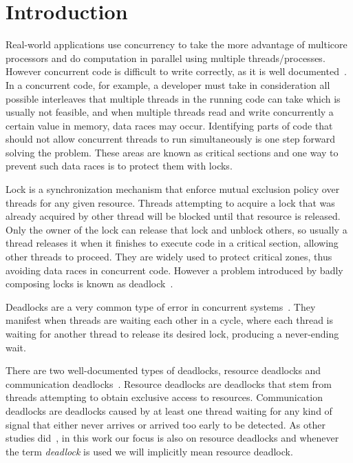 \chapter{Introduction}
\label{chp:introduction}


Real-world applications use concurrency to take the more advantage of multicore processors and do computation in parallel using multiple threads/processes.
However concurrent code is difficult to write correctly, as it is well documented~\citep{lu}.
In a concurrent code, for example, a developer must take in consideration all possible interleaves that multiple threads in the running code can take which is usually not feasible, and when multiple threads read and write concurrently a certain value in memory, data races may occur.
Identifying parts of code that should not allow concurrent threads to run simultaneously is one step forward solving the problem.
These areas are known as critical sections and one way to prevent such data races is to protect them with locks.

Lock is a synchronization mechanism that enforce mutual exclusion policy over threads for any given resource.
Threads attempting to acquire a lock that was already acquired by other thread will be blocked until that resource is released. 
Only the owner of the lock can release that lock and unblock others, so usually a thread releases it when it finishes to execute code in a critical section, allowing other threads to proceed.
They are widely used to protect critical zones, thus avoiding data races in concurrent code.
However a problem introduced by badly composing locks is known as deadlock~\citep{pyla}.

Deadlocks are a very common type of error in concurrent systems~\citep{lu}.
They manifest when threads are waiting each other in a cycle, where each thread is waiting for another thread to release its desired lock, producing a never-ending wait.

There are two well-documented types of deadlocks, resource deadlocks and communication deadlocks~\citep{singhal}\citep{knapp}.
Resource deadlocks are deadlocks that stem from threads attempting to obtain exclusive access to resources.
Communication deadlocks are deadlocks caused by at least one thread waiting for any kind of signal that either never arrives or arrived too early to be detected.
As other studies did~\citep{mcsdk}\citep{magicfuzzer}, in this work our focus is also on resource deadlocks and whenever the term \emph{deadlock} is used we will implicitly mean resource deadlock.

